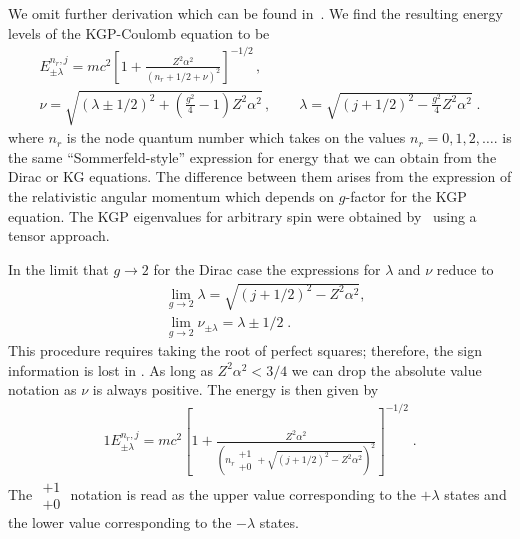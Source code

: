 We omit further derivation which can be found in~\cite{Steinmetz:2018ryf}. We find the resulting energy levels of the KGP-Coulomb equation to be 
\begin{gather}
\label{cou17} E_{\pm\lambda}^{n_{r},j}=mc^{2}\left[1+\displaystyle\frac{Z^{2}\alpha^{2}}{\left(n_{r}+1/2+\nu\right)^{2}}\right]^{-1/2}\,,\\
\label{cou17b} \nu=\sqrt{(\lambda\pm1/2)^{2}+\left(\frac{g^{2}}{4}-1\right)Z^{2}\alpha^{2}}\,,\qquad
\lambda=\sqrt{\displaystyle(j+1/2)^{2}-\frac{\displaystyle g^{2}}{4}Z^{2}\alpha^{2}}\;.
\end{gather}
where $n_{r}$ is the node quantum number which takes on the values $n_{r}=0,1,2,\ldots$.  is the same ``Sommerfeld-style'' expression for energy that we can obtain from the Dirac or KG equations. The difference between them arises from the expression of the relativistic angular momentum which depends on $g$-factor for the KGP equation. The KGP eigenvalues  for arbitrary spin were obtained by~\cite{Niederle:2004bx} using a tensor approach.

In the limit that $g\rightarrow2$ for the Dirac case the expressions for $\lambda$ and $\nu$ reduce to
\begin{subequations}
\begin{alignat}{1}
\label{glimit01} &\lim_{g\rightarrow2}\lambda=\sqrt{\displaystyle(j+1/2)^{2}-Z^{2}\alpha^{2}},\\
&\lim_{g\rightarrow2}\nu_{\pm\lambda}=\lambda\pm1/2\;.
\end{alignat}
\end{subequations}
This procedure requires taking the root of perfect squares; therefore, the sign information is lost in . As long as $Z^{2}\alpha^{2}<3/4$ we can drop the absolute value notation as $\nu$ is always positive. The energy is then given by
\begin{alignat}{1}
\label{glimit02}
E_{\pm\lambda}^{n_{r},j}=mc^{2}\left[1+\displaystyle\frac{Z^{2}\alpha^{2}}{\left(n_{r}\begin{smallmatrix} +1 \\ +0 \end{smallmatrix}+\sqrt{\displaystyle(j+1/2)^{2}-Z^{2}\alpha^{2}}\right)^{2}}\right]^{-1/2}\;.
\end{alignat}
The $\begin{smallmatrix} +1 \\ +0 \end{smallmatrix}$ notation is read as the upper value corresponding to the $+\lambda$ states and the lower value corresponding to the $-\lambda$ states. 

